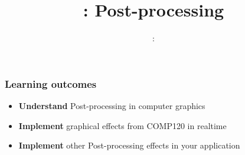 \usepackage{../../beamerthemeFalmouthGamesAcademy}
\usepackage{multimedia}
\graphicspath{ {../../} }




\usepackage[normalem]{ulem}
\usepackage{wasysym}

\usepackage{pdfpages}

\usetikzlibrary{arrows,automata}




\title{\sessionnumber: Post-processing}
\subtitle{\modulecode: \moduletitle}

\frame{\titlepage} 

\begin{frame}
	\frametitle{Learning outcomes}
	\begin{itemize}
		\item \textbf{Understand} Post-processing in computer graphics
		\item \textbf{Implement} graphical effects from COMP120 in realtime 
		\item \textbf{Implement} other Post-processing effects in your application
	\end{itemize}
\end{frame}










